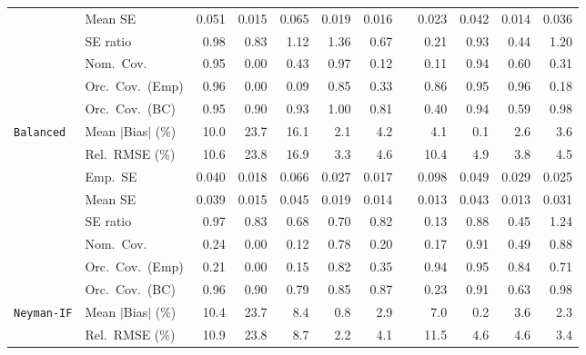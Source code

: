 \begin{landscape}
\begin{longtable}{llrrrrrrrrrr}
 & Mean SE & 0.051 & 0.015 & 0.065 & 0.019 & 0.016 &  & 0.023 & 0.042 & 0.014 & 0.036 \\
 & SE ratio & \cellcolor{rankone}0.98 & 0.83 & \cellcolor{rankthree}1.12 & 1.36 & 0.67 &  & 0.21 & \cellcolor{ranktwo}0.93 & 0.44 & 1.20 \\
 & Nom.\ Cov. & \cellcolor{rankone}0.95 & 0.00 & 0.43 & \cellcolor{rankthree}0.97 & 0.12 &  & 0.11 & \cellcolor{ranktwo}0.94 & 0.60 & 0.31 \\
 & Orc.\ Cov.\ (Emp) & \cellcolor{ranktwo}0.96 & 0.00 & 0.09 & 0.85 & 0.33 &  & 0.86 & \cellcolor{rankone}0.95 & \cellcolor{rankthree}0.96 & 0.18 \\
 & Orc.\ Cov.\ (BC) & \cellcolor{rankone}0.95 & 0.90 & \cellcolor{rankthree}0.93 & 1.00 & 0.81 &  & 0.40 & \cellcolor{ranktwo}0.94 & 0.59 & 0.98 \\
\addlinespace[2pt]
\quad \texttt{Balanced} & Mean $|$Bias$|$ (\%) & 10.0 & 23.7 & 16.1 & \cellcolor{ranktwo}2.1 & 4.2 &  & 4.1 & \cellcolor{rankone}0.1 & \cellcolor{rankthree}2.6 & 3.6 \\
 & Rel.\ RMSE (\%) & 10.6 & 23.8 & 16.9 & \cellcolor{rankone}3.3 & 4.6 &  & 10.4 & 4.9 & \cellcolor{ranktwo}3.8 & \cellcolor{rankthree}4.5 \\
 & Emp.\ SE & 0.040 & 0.018 & 0.066 & 0.027 & 0.017 &  & 0.098 & 0.049 & 0.029 & 0.025 \\
 & Mean SE & 0.039 & 0.015 & 0.045 & 0.019 & 0.014 &  & 0.013 & 0.043 & 0.013 & 0.031 \\
 & SE ratio & \cellcolor{rankone}0.97 & \cellcolor{rankthree}0.83 & 0.68 & 0.70 & 0.82 &  & 0.13 & \cellcolor{ranktwo}0.88 & 0.45 & 1.24 \\
 & Nom.\ Cov. & 0.24 & 0.00 & 0.12 & \cellcolor{rankthree}0.78 & 0.20 &  & 0.17 & \cellcolor{rankone}0.91 & 0.49 & \cellcolor{ranktwo}0.88 \\
 & Orc.\ Cov.\ (Emp) & 0.21 & 0.00 & 0.15 & 0.82 & 0.35 &  & \cellcolor{ranktwo}0.94 & \cellcolor{rankone}0.95 & \cellcolor{rankthree}0.84 & 0.71 \\
 & Orc.\ Cov.\ (BC) & \cellcolor{rankone}0.96 & 0.90 & 0.79 & 0.85 & 0.87 &  & 0.23 & \cellcolor{rankthree}0.91 & 0.63 & \cellcolor{ranktwo}0.98 \\
\addlinespace[2pt]
\quad \texttt{Neyman-IF} & Mean $|$Bias$|$ (\%) & 10.4 & 23.7 & 8.4 & \cellcolor{ranktwo}0.8 & 2.9 &  & 7.0 & \cellcolor{rankone}0.2 & 3.6 & \cellcolor{rankthree}2.3 \\
 & Rel.\ RMSE (\%) & 10.9 & 23.8 & 8.7 & \cellcolor{rankone}2.2 & \cellcolor{rankthree}4.1 &  & 11.5 & 4.6 & 4.6 & \cellcolor{ranktwo}3.4 \\

\end{longtable}
\end{landscape}

